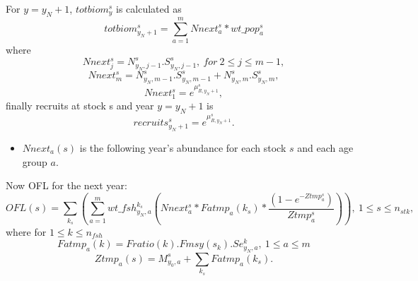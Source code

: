 \documentclass{article}
\begin{document}
For $y=y_N+1$, $totbiom^s_y$ is calculated as
\begin{equation}
totbiom^s_{y_N+1}=\sum_{a=1}^m Nnext^s_a*wt\_pop^s_a
\end{equation}
where 
\begin{equation}
Nnext^s_j=N^s_{y_N,j-1}.S^s_{y_N,j-1}, \ for \ 2\leq j\leq m-1,
\end{equation}
\begin{equation}
Nnext^s_m=N^s_{y_N,m-1}.S^s_{y_N,m-1}+N^s_{y_N,m}.S^s_{y_N,m},
\end{equation}
\begin{equation}
    Nnext^s_1=e^{\mu^s_{R,y_N+1}},
\end{equation}
finally recruits at stock s and year $y=y_N+1$ is
\begin{equation}
recruits^s_{y_N+1}=e^{\mu^s_{R,y_N+1}}.
\end{equation}

\begin{itemize}
    \item $Nnext_a(s)$ is the following year's abundance for each stock $s$ and each age group $a$.

\end{itemize}
Now OFL for the next year:
\begin{equation}
    OFL(s) =\sum_{k_s} \left(\sum_{a=1}^mwt\_fsh^{k_s}_{y_N,a} \left(Nnext_a^s * Fatmp_a(k_s) * \dfrac{(1 - e^{-Ztmp^s_a})}{Ztmp^s_a}\right)\right), \ 1\leq s \leq n_{stk},
\end{equation}
where for $1\leq k \leq n_{fsh}$ 
\begin{equation}
    Fatmp_a(k)=Fratio(k).Fmsy(s_k).Se^k_{y_N,a}, \  1\leq a \leq m
\end{equation}
\begin{equation}
    Ztmp_a(s)=M^s_{y_0,a}+ \sum_{k_s}Fatmp_a(k_s).
\end{equation}
\end{document}

